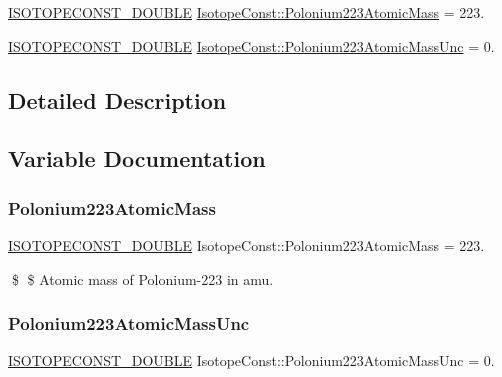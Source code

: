 \begin{DoxyCompactItemize}
\item 
\mbox{\hyperlink{group___isotope_const-_macros_ga8f45a7272ce02c0b4c65c44636ed719a}{I\+S\+O\+T\+O\+P\+E\+C\+O\+N\+S\+T\+\_\+\+D\+O\+U\+B\+LE}} \mbox{\hyperlink{group___isotope_const-_polonium-_po223_gaced811808620a62e8f59565f23ec8ec7}{Isotope\+Const\+::\+Polonium223\+Atomic\+Mass}} = 223.
\item 
\mbox{\hyperlink{group___isotope_const-_macros_ga8f45a7272ce02c0b4c65c44636ed719a}{I\+S\+O\+T\+O\+P\+E\+C\+O\+N\+S\+T\+\_\+\+D\+O\+U\+B\+LE}} \mbox{\hyperlink{group___isotope_const-_polonium-_po223_gab57e60751c65b650a5eef95b828abc71}{Isotope\+Const\+::\+Polonium223\+Atomic\+Mass\+Unc}} = 0.
\end{DoxyCompactItemize}


\subsection{Detailed Description}


\subsection{Variable Documentation}
\mbox{\label{group___isotope_const-_polonium-_po223_gaced811808620a62e8f59565f23ec8ec7}} 
\subsubsection{\texorpdfstring{Polonium223\+Atomic\+Mass}{Polonium223AtomicMass}}
{\footnotesize\ttfamily \mbox{\hyperlink{group___isotope_const-_macros_ga8f45a7272ce02c0b4c65c44636ed719a}{I\+S\+O\+T\+O\+P\+E\+C\+O\+N\+S\+T\+\_\+\+D\+O\+U\+B\+LE}} Isotope\+Const\+::\+Polonium223\+Atomic\+Mass = 223.}

\$ \$ Atomic mass of Polonium-\/223 in amu. \mbox{\label{group___isotope_const-_polonium-_po223_gab57e60751c65b650a5eef95b828abc71}} 
\subsubsection{\texorpdfstring{Polonium223\+Atomic\+Mass\+Unc}{Polonium223AtomicMassUnc}}
{\footnotesize\ttfamily \mbox{\hyperlink{group___isotope_const-_macros_ga8f45a7272ce02c0b4c65c44636ed719a}{I\+S\+O\+T\+O\+P\+E\+C\+O\+N\+S\+T\+\_\+\+D\+O\+U\+B\+LE}} Isotope\+Const\+::\+Polonium223\+Atomic\+Mass\+Unc = 0.}

